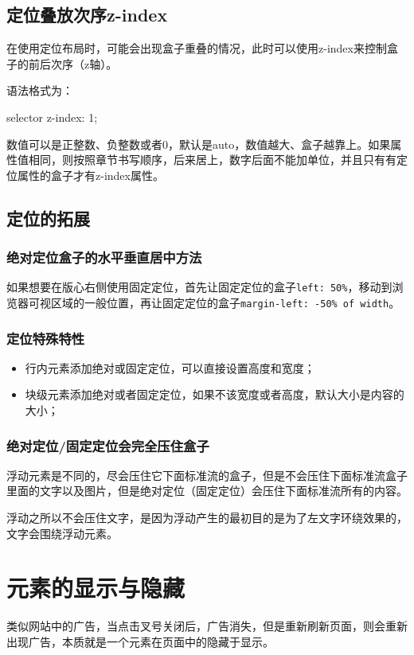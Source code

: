 \subsection{定位叠放次序z-index}
在使用定位布局时，可能会出现盒子重叠的情况，此时可以使用z-index来控制盒子的前后次序（z轴）。

语法格式为：
\begin{css}
    selector {
    z-index: 1;
    }
\end{css}

数值可以是正整数、负整数或者0，默认是auto，数值越大、盒子越靠上。如果属性值相同，则按照章节书写顺序，后来居上，数字后面不能加单位，并且只有有定位属性的盒子才有z-index属性。
\subsection{定位的拓展}
\subsubsection{绝对定位盒子的水平垂直居中方法}
如果想要在版心右侧使用固定定位，首先让固定定位的盒子\verb|left: 50%|，移动到浏览器可视区域的一般位置，再让固定定位的盒子\verb|margin-left: -50% of width|。

\subsubsection{定位特殊特性}
\begin{itemize}
    \item 行内元素添加绝对或固定定位，可以直接设置高度和宽度；
    \item 块级元素添加绝对或者固定定位，如果不该宽度或者高度，默认大小是内容的大小；
\end{itemize}
\subsubsection{绝对定位/固定定位会完全压住盒子}
浮动元素是不同的，尽会压住它下面标准流的盒子，但是不会压住下面标准流盒子里面的文字以及图片，但是绝对定位（固定定位）会压住下面标准流所有的内容。

浮动之所以不会压住文字，是因为浮动产生的最初目的是为了左文字环绕效果的，文字会围绕浮动元素。

\section{元素的显示与隐藏}
类似网站中的广告，当点击叉号关闭后，广告消失，但是重新刷新页面，则会重新出现广告，本质就是一个元素在页面中的隐藏于显示。
